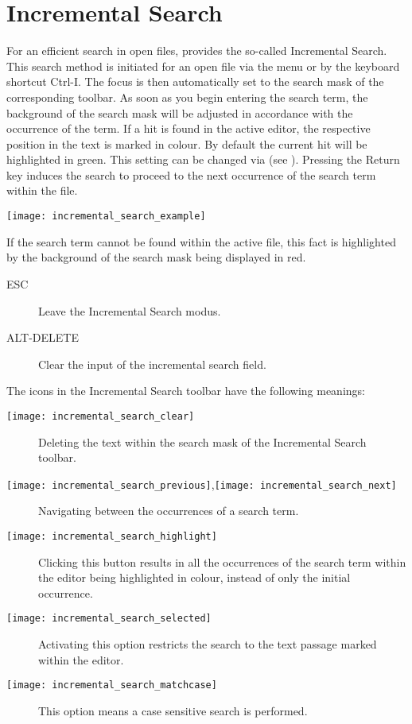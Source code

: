 \section{Incremental Search}

For an efficient search in open files, \codeblocks provides the so-called Incremental Search. This search method is initiated for an open file via the menu  or by the keyboard shortcut Ctrl-I. The focus is then automatically set to the search mask of the corresponding toolbar. As soon as you begin entering the search term, the background of the search mask will be adjusted in accordance with the occurrence of the term. If a hit is found in the active editor, the respective position in the text is marked in colour. By default the current hit will be highlighted in green. This setting can be changed via  (see ). Pressing the Return key induces the search to proceed to the next occurrence of the search term within the file.

\texttt{[image: incremental\_search\_example]}

If the search term cannot be found within the active file, this fact is highlighted by the background of the search mask being displayed in red.

\begin{description}
\item[ESC] Leave the Incremental Search modus.
\item[ALT-DELETE] Clear the input of the incremental search field.
\end{description}

The icons in the Incremental Search toolbar have the following meanings:

\begin{description}
\item[\texttt{[image: incremental\_search\_clear]}] Deleting the text within the search mask of the Incremental Search toolbar.
\item[\texttt{[image: incremental\_search\_previous]},\texttt{[image: incremental\_search\_next]}] Navigating between the occurrences of a search term.
\item[\texttt{[image: incremental\_search\_highlight]}] Clicking this button results in all the occurrences of the search term within the editor being highlighted in colour, instead of only the initial occurrence.
\item[\texttt{[image: incremental\_search\_selected]}] Activating this option restricts the search to the text passage marked within the editor.
\item[\texttt{[image: incremental\_search\_matchcase]}] This option means a case sensitive search is performed.
\end{description}


